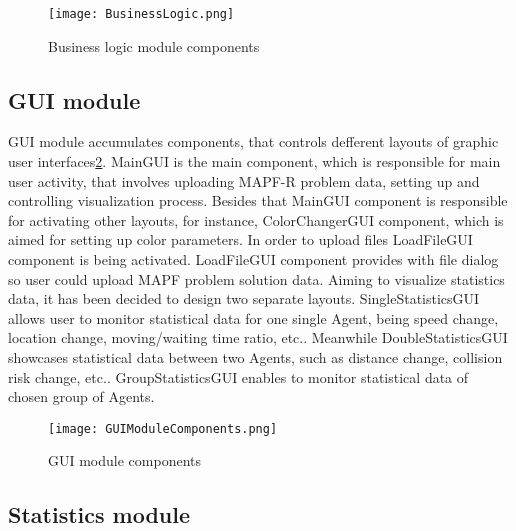 \documentclass[thesis=B,english]{FITthesis}[2019/12/23]
\begin{document}
\begin{figure}
	\texttt{[image: BusinessLogic.png]}
	\caption[Business logic]{Business logic module components}\label{fig:float5}
\end{figure}

\subsection{GUI module}

GUI module accumulates components, that controls defferent layouts of graphic user interfaces\ref{fig:float6}. MainGUI is the main component, which is responsible for main user activity, that involves uploading MAPF-R problem data, setting up and controlling visualization process. Besides that MainGUI component is responsible for activating other layouts, for instance, ColorChangerGUI component, which is aimed for setting up color parameters. In order to upload files LoadFileGUI component is being activated. LoadFileGUI component provides with file dialog so user could upload MAPF problem solution data. Aiming to visualize statistics data, it has been decided to design two separate layouts. SingleStatisticsGUI allows user to monitor statistical data for one single Agent, being speed change, location change, moving/waiting time ratio, etc.. Meanwhile DoubleStatisticsGUI showcases statistical data between two Agents, such as distance change, collision risk change, etc.. GroupStatisticsGUI enables to monitor statistical data of chosen group of Agents.     

\begin{figure}
	\texttt{[image: GUIModuleComponents.png]}
	\caption[GUI]{GUI module components}\label{fig:float6}
\end{figure}

\subsection{Statistics module}
\end{document}
